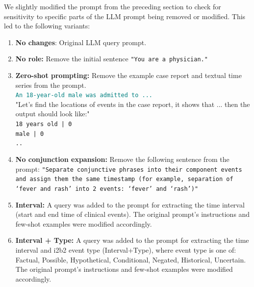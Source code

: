 \documentclass[pdflatex,sn-mathphys-num]{sn-jnl}%
\theoremstyle{thmstyleone}%
\theoremstyle{thmstyletwo}%
\theoremstyle{thmstylethree}%
\begin{document}
We slightly modified the prompt from the preceding section to check for sensitivity to specific parts of the LLM prompt being removed or modified.
This led to the following variants:
\begin{enumerate}
    \item \textbf{No changes}: Original LLM query prompt. %
    
    \item \textbf{No role:} Remove the initial sentence \texttt{"You are a physician."}
    
    \item \textbf{Zero-shot prompting:} Remove the example case report and textual time series from the prompt. \\
    \textcolor{teal}{\texttt{An 18-year-old male was admitted to ...}}\\
    "Let's find the locations of events in the case report, it shows that ... then the output should look like:"\\
    \texttt{18 years old | 0 \\
    male | 0 \\
    ..}

    \item \textbf{No conjunction expansion:} Remove the following sentence from the prompt: \texttt{"Separate conjunctive phrases into their component events and assign them the same timestamp (for example, separation of ‘fever and rash’ into 2 events: ‘fever’ and ‘rash’)"}
    
    \item \textbf{Interval:} A query was added to the prompt for extracting the time interval (start and end time of clinical events). The original prompt’s instructions and few-shot examples were modified accordingly. 
    
    \item \textbf{Interval + Type:} A query was added to the prompt for extracting the time interval and i2b2
    event type (Interval+Type), where event type is one of: Factual, Possible, Hypothetical, Conditional, Negated, Historical, Uncertain. The original prompt’s instructions and few-shot examples were modified accordingly. 
\end{enumerate}
\end{document}
